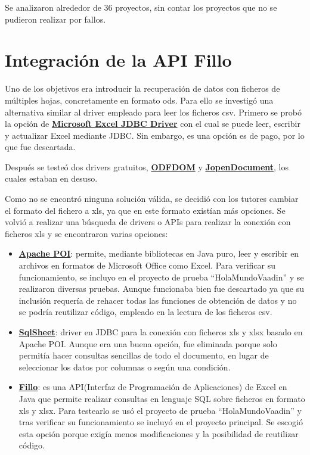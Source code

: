 Se analizaron alrededor de 36 proyectos, sin contar los proyectos que no se pudieron realizar por fallos.

\section{Integración de la API Fillo}
Uno de los objetivos era introducir la recuperación de datos con ficheros de múltiples hojas, concretamente en formato ods.
Para ello se investigó una alternativa similar al driver empleado para leer los ficheros csv. Primero se probó la opción de \textbf{\href{https://www.cdata.com/drivers/excel/jdbc/}{Microsoft Excel JDBC Driver}} con el cual se puede leer, escribir y actualizar Excel mediante JDBC. Sin embargo, es una opción es de pago, por lo que fue descartada. 

Después se testeó dos drivers gratuitos, \textbf{\href{https://odftoolkit.org/}{ODFDOM}} y \textbf{\href{http://www.jopendocument.org/}{JopenDocument}}, los cuales estaban en desuso.

Como no se encontró ninguna solución válida, se decidió con los tutores cambiar el formato del fichero a xls, ya que en este formato existían más opciones. Se volvió a realizar una búsqueda de drivers o APIs para realizar la conexión con ficheros xls y se encontraron varias opciones: 
\begin{itemize}
	\item \textbf{\href{https://poi.apache.org/}{Apache POI}}: permite, mediante bibliotecas en Java puro, leer y escribir en archivos en formatos de Microsoft Office como Excel. Para verificar su funcionamiento, se incluyo en el proyecto de prueba ``HolaMundoVaadin'' y se realizaron diversas pruebas. Aunque funcionaba bien fue descartado ya que su inclusión requería de rehacer todas las funciones de obtención de datos y no se podría reutilizar código, empleado en la lectura de los ficheros csv.
	\item \textbf{\href{https://code.google.com/archive/p/sqlsheet/}{SqlSheet}}: driver en JDBC para la conexión con ficheros xls y xlsx basado en Apache POI. Aunque era una buena opción, fue eliminada porque solo permitía hacer consultas sencillas de todo el documento, en lugar de seleccionar los datos por columnas o según una condición. 
	\item \textbf{\href{https://codoid.com/fillo/}{Fillo}}: es una API(Interfaz de Programación de Aplicaciones) de Excel en Java que permite realizar consultas en lenguaje SQL sobre ficheros en formato xls y xlsx. Para testearlo se usó el proyecto de prueba ``HolaMundoVaadin'' y tras verificar su funcionamiento se incluyó en el proyecto principal. Se escogió esta opción porque exigía menos modificaciones y la posibilidad de reutilizar código.
\end{itemize}

